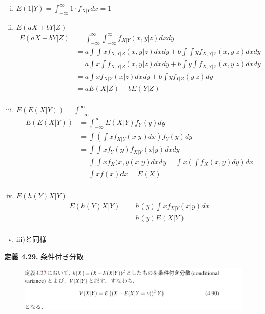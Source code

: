 \documentclass[dvipdfmx,10pt, a4j]{jarticle}
\theoremstyle{definition}
\begin{document}
\begin{enumerate}[i)]
  \item $E(1|Y) = \int_{-\infty}^{\infty} 1 \cdot f_{X|Y}dx = 1$\\
  \item $E(aX + bY | Z)$
  \begin{align*}
    E(aX + bY | Z) &= \int_{-\infty}^{\infty}\int_{-\infty}^{\infty}f_{X|Y}(x, y|z)dxdy\\
    &= a \int\int x f_{X, Y|Z}(x, y|z)dxdy + b \int\int y f_{X, Y|Z}(x, y|z)dxdy\\
    &= a \int x\int f_{X, Y|Z}(x, y|z)dxdy + b \int y\int f_{X, Y|Z}(x, y|z)dxdy\\
    &= a \int x f_{X|Z}(x|z)dxdy + b \int y f_{Y|Z}(y|z)dy\\
    &= a E(X|Z) + bE(Y|Z)\\
  \end{align*}
  \item $E(E(X|Y)) = \int_{-\infty}^{\infty}$
  \begin{align*}
    E(E(X|Y)) &= \int_{-\infty}^{\infty}E(X|Y)f_Y(y)dy\\
    &= \int (\int x f_{X|Y}(x|y)dx)f_Y(y)dy\\
    &= \int \int x f_Y(y)f_{X|Y}(x|y)dxdy\\
    &= \int \int x f_X(x, y(x|y)dxdy = \int x (\int f_X(x, y)dy)dx\\
    &= \int x f(x)dx = E(X)\\
  \end{align*}
  \item $E(h(Y)X|Y)$\\
  \begin{align*}
    E(h(Y)X|Y) &= h(y)\int x f_{X|Y}(x|y)dx\\
    &= h(y)E(X|Y)\\
  \end{align*}
  \item iii)と同様\\
\end{enumerate}

\noindent
\textbf{定義 4.29.} 条件付き分散\\
\begin{figure}[htbp]
\includegraphics[width=\linewidth]{D_11/teigi/4_29.png}
\end{figure}
\end{document}
